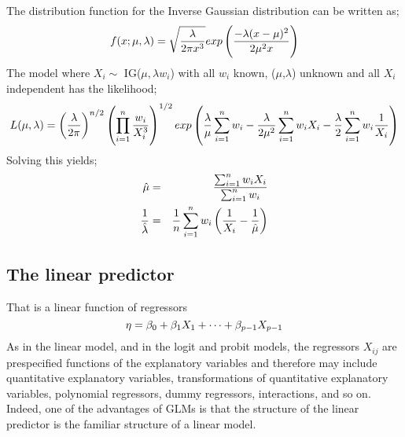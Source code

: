 The distribution function for the Inverse Gaussian distribution can be written as;
\begin{equation}
	\centering
	f(x;\mu,\lambda) = \sqrt{\frac{\lambda}{2\pi x^{3}}} exp\left(\frac{-\lambda(x-\mu)^{2}}{2\mu^{2} x}\right)
\end{equation}
The model where $X_{i} \sim$ IG($\mu,\lambda w_{i}$) with all $w_{i}$ known, ($\mu$,$\lambda$) unknown and all $X_{i}$ independent has the likelihood;
\begin{equation}
	\centering
	L(\mu,\lambda) = \left(\frac{\lambda}{2\pi}\right)^{n/2} \left(\prod_{i=1}^{n} \frac{w_{i}}{X_{i}^{3}}\right)^{1/2} exp \left(\frac{\lambda}{\mu} \sum_{i=1}^{n} w_{i} - \frac{\lambda}{2\mu^{2}} \sum_{i=1}^{n} w_{i} X_{i} - \frac{\lambda}{2} \sum_{i=1}^{n} w_{i} \frac{1}{X_{i}}\right)
\end{equation}
Solving this yields;
\begin{equation}
	\centering
	\begin{aligned}[b]
	\hat{\mu} & = & \frac{\sum_{i=1}^{n} w_{i} X_{i}}{\sum_{i=1}^{n} w_{i}}\\
	\frac{1}{\hat{\lambda}} & = & \frac{1}{n} \sum_{i=1}^{n} w_{i} \left( \frac{1}{X_{i}} - \frac{1}{\hat{\mu}}\right) 
	\end{aligned}
\end{equation}
\subsection{The linear predictor}That is a linear function of regressors
\begin{equation}
	\centering
	\eta = \beta_0 + \beta_1 X_1 + \cdots + \beta_{p-1}X_{p-1} 
\end{equation}
As in the linear model, and in the logit and probit models, the regressors $X_{ij}$ are prespecified functions of the explanatory variables and therefore may include quantitative explanatory variables, transformations of quantitative explanatory variables, polynomial regressors, dummy regressors, interactions, and so on. Indeed, one of the advantages of GLMs is that the structure of the linear predictor is the familiar structure of a linear model.
